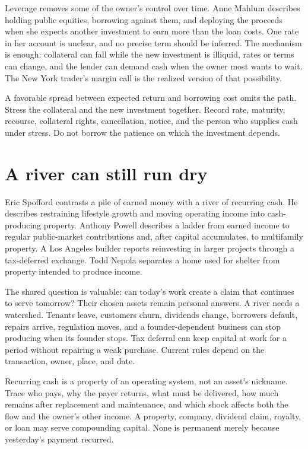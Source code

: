 Leverage removes some of the owner's control over time. Anne Mahlum describes
holding public equities, borrowing against them, and deploying the proceeds
when she expects another investment to earn more than the loan costs. One rate
in her account is unclear, and no precise term should be inferred.
The mechanism is enough: collateral can fall while the new investment is
illiquid, rates or terms can change, and the lender can demand cash when the
owner most wants to wait. The New York trader's margin call is the realized
version of that possibility.

A favorable spread between expected return and borrowing cost omits the path.
Stress the collateral and the new investment together. Record rate, maturity,
recourse, collateral rights, cancellation, notice, and the person who supplies
cash under stress. Do not borrow the patience on which the investment depends.

\section{A river can still run dry}

Eric Spofford contrasts a pile of earned money with a river of recurring cash.
He describes restraining lifestyle growth and moving operating income into
cash-producing property. Anthony Powell describes a ladder from earned income
to regular public-market contributions and, after capital accumulates, to
multifamily property. A Los Angeles builder reports reinvesting in larger
projects through a tax-deferred exchange. Todd Nepola separates a home used for
shelter from property intended to produce income.

The shared question is valuable: can today's work create a claim that continues
to serve tomorrow? Their chosen assets remain personal answers. A river needs
a watershed. Tenants leave, customers churn, dividends change, borrowers
default, repairs arrive, regulation moves, and a founder-dependent business
can stop producing when its founder stops. Tax deferral can keep capital at
work for a period without repairing a weak purchase. Current rules depend on
the transaction, owner, place, and date.

Recurring cash is a property of an operating system, not an asset's nickname.
Trace who pays, why the payer returns, what must be delivered, how much remains
after replacement and maintenance, and which shock affects both the flow and
the owner's other income. A property, company, dividend claim, royalty, or loan
may serve compounding capital. None is permanent merely because yesterday's
payment recurred.

